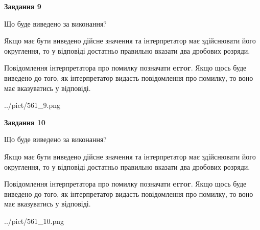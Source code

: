 \documentclass[12pt, ukrainian]{article}
\begin{document}
{\begin {Large}
{\begin {center}\textbf{Завдання 9}\end {center}}\par
Що буде виведено за виконання? \par

Якщо має бути виведено дійсне значення та інтерпретатор має здійснювати його округлення, 
то у відповіді достатньо правильно вказати два дробових розряди.

Повідомлення інтерпретатора про помилку позначати \textbf{error}.
Якщо щось буде виведено до того, як інтерпретатор видасть повідомлення про помилку, 
то воно має вказуватись у відповіді. \par

\begin{center}
	{../pict/561_9.png}
\end{center}
\newpage

{\begin {center}\textbf{Завдання 10}\end {center}}\par
Що буде виведено за виконання? \par

Якщо має бути виведено дійсне значення та інтерпретатор має здійснювати його округлення, 
то у відповіді достатньо правильно вказати два дробових розряди.

Повідомлення інтерпретатора про помилку позначати \textbf{error}.
Якщо щось буде виведено до того, як інтерпретатор видасть повідомлення про помилку, 
то воно має вказуватись у відповіді. \par

\begin{center}
	{../pict/561_10.png}
\end{center}
\newpage

\end {Large}}
\end{document}
